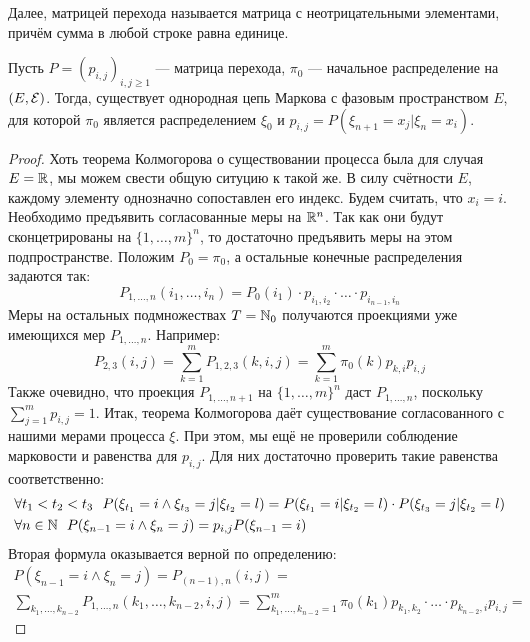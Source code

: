 \begin{note}
	Далее, матрицей перехода называется матрица с неотрицательными элементами, причём сумма в любой строке равна единице.
\end{note}

\begin{theorem}
	Пусть $P = (p_{i, j})_{i, j \ge 1}$ --- матрица перехода, $\pi_0$ --- начальное распределение на $(E, \mathcal{E})$. Тогда, существует однородная цепь Маркова с фазовым пространством $E$, для которой $\pi_0$ является распределением $\xi_0$ и $p_{i, j} = P(\xi_{n + 1} = x_j | \xi_n = x_i)$.
\end{theorem}

\begin{proof}
	Хоть теорема Колмогорова о существовании процесса была для случая $E = \mathbb{R}$, мы можем свести общую ситуцию к такой же. В силу счётности $E$, каждому элементу однозначно сопоставлен его индекс. Будем считать, что $x_i = i$. Необходимо предъявить согласованные меры на $\mathbb{R}^n$. Так как они будут сконцетрированы на $\{1, \ldots, m\}^n$, то достаточно предъявить меры на этом подпространстве. Положим $P_0 = \pi_0$, а остальные конечные распределения задаются так:
	\[
		P_{1, \ldots, n}(i_1, \ldots, i_n) = P_0(i_1) \cdot p_{i_1, i_2} \cdot \ldots \cdot p_{i_{n - 1}, i_n}
	\]
	Меры на остальных подмножествах $T = \mathbb{N}_0$ получаются проекциями уже имеющихся мер $P_{1, \ldots, n}$. Например:
	\[
		P_{2, 3}(i, j) = \sum_{k = 1}^m P_{1, 2, 3}(k, i, j) = \sum_{k = 1}^m \pi_0(k)p_{k, i}p_{i, j}
	\]
	Также очевидно, что проекция $P_{1, \ldots, n + 1}$ на $\{1, \ldots, m\}^n$ даст $P_{1, \ldots, n}$, поскольку $\sum_{j = 1}^m p_{i, j} = 1$. Итак, теорема Колмогорова даёт существование согласованного с нашими мерами процесса $\xi$. При этом, мы ещё не проверили соблюдение марковости и равенства для $p_{i, j}$. Для них достаточно проверить такие равенства соответственно:
	\begin{align*}
		&{\forall t_1 < t_2 < t_3\ \ P(\xi_{t_1} = i \wedge \xi_{t_3} = j | \xi_{t_2} = l) = P(\xi_{t_1} = i | \xi_{t_2} = l) \cdot P(\xi_{t_3} = j | \xi_{t_2} = l)}
		\\
		&{\forall n \in \mathbb{N}\ \ P(\xi_{n - 1} = i \wedge \xi_n = j) = p_{i, j}P(\xi_{n - 1} = i)}
	\end{align*}
	Вторая формула оказывается верной по определению:
	\begin{multline*}
		P(\xi_{n - 1} = i \wedge \xi_n = j) = P_{(n - 1), n}(i, j) =
		\\
		\sum_{k_1, \ldots, k_{n - 2}} P_{1, \ldots, n}(k_1, \ldots, k_{n - 2}, i, j) = \sum_{k_1, \ldots, k_{n - 2} = 1}^m \pi_0(k_1)p_{k_1, k_2} \cdot \ldots \cdot p_{k_{n - 2}, i}p_{i, j} =

\end{multline*}
\end{proof}
